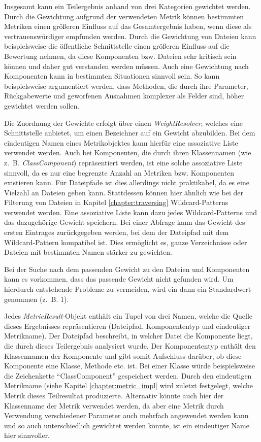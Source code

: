 Insgesamt kann ein Teilergebnis anhand von drei Kategorien gewichtet werden. Durch die Gewichtung aufgrund der verwendeten Metrik können bestimmten Metriken einen größeren Einfluss auf das Gesamtergebnis haben, wenn diese als vertrauenswürdiger empfunden werden. Durch die Gewichtung von Dateien kann beispielsweise die öffentliche Schnittstelle einen größeren Einfluss auf die Bewertung nehmen, da diese Komponenten bzw. Dateien sehr kritisch sein können und daher gut verstanden werden müssen. Auch eine Gewichtung nach Komponenten kann in bestimmten Situationen sinnvoll sein. So kann beispielsweise argumentiert werden, dass Methoden, die durch ihre Parameter, Rückgabewerte und geworfenen Ausnahmen komplexer als Felder sind, höher gewichtet werden sollen.

Die Zuordnung der Gewichte erfolgt über einen \textit{WeightResolver}, welches eine Schnittstelle anbietet, um einen Bezeichner auf ein Gewicht abzubilden. Bei dem eindeutigen Namen eines Metrikobjektes kann hierfür eine assoziative Liste verwendet werden. Auch bei Komponenten, die durch ihren Klassennamen (wie z.~B. \textit{ClassComponent}) repräsentiert werden, ist  eine solche assoziative Liste sinnvoll, da es nur eine begrenzte Anzahl an Metriken bzw. Komponenten existieren kann.
Für Dateipfade ist dies allerdings nicht praktikabel, da es eine Vielzahl an Dateien geben kann. Stattdessen können hier ähnlich wie bei der Filterung von Dateien in Kapitel \ref{chapter:traversing} Wildcard-Patterns verwendet werden. Eine assoziative Liste kann dazu jedes Wildcard-Patterns und das dazugehörige Gewicht speichern. Bei einer Abfrage kann das Gewicht des ersten Eintrages zurückgegeben werden, bei dem der Dateipfad mit dem Wildcard-Pattern kompatibel ist. Dies ermöglicht es, ganze Verzeichnisse oder Dateien mit bestimmten Namen stärker zu gewichten. 

Bei der Suche nach dem passenden Gewicht zu den Dateien und Komponenten kann es vorkommen, dass das passende Gewicht nicht gefunden wird. Um hierdurch entstehende Probleme zu vermeiden, wird ein dann ein Standardwert genommen (z.~B. 1). 

Jedes \textit{MetricResult}-Objekt enthält ein Tupel von drei Namen, welche die Quelle dieses Ergebnisses repräsentieren (Dateipfad, Komponententyp und eindeutiger Metrikname). Der Dateipfad beschreibt, in welcher Datei die Komponente liegt, die durch dieses Teilergebnis analysiert wurde. Der Komponententyp enthält den Klassennamen der Komponente und gibt somit Aufschluss darüber, ob diese Komponente eine Klasse, Methode etc. ist. Bei einer Klasse würde beispielsweise die Zeichenkette \enquote{ClassComponent} gespeichert werden. Durch den eindeutigen Metrikname (siehe Kapitel \ref{chapter:metric_impl} wird zuletzt festgelegt, welche Metrik dieses Teilresultat produzierte. Alternativ könnte auch hier der Klassenname der Metrik verwendet werden, da aber eine Metrik durch Verwendung verschiedener Parameter auch mehrfach angewendet werden kann und so auch unterschiedlich gewichtet werden könnte, ist ein eindeutiger Name hier sinnvoller.

